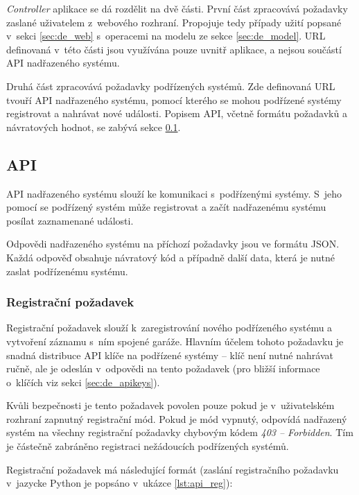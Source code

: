 \textit{Controller} aplikace se dá rozdělit na dvě části. První část zpracovává požadavky zaslané uživatelem z~webového rozhraní. Propojuje tedy případy užití popsané v~sekci \ref{sec:de_web} s~operacemi na modelu ze sekce \ref{sec:de_model}. URL definovaná v~této části jsou využívána pouze uvnitř aplikace, a nejsou součástí API nadřazeného systému.

Druhá část zpracovává požadavky podřízených systémů. Zde definovaná URL tvouří API nadřazeného systému, pomocí kterého se mohou podřízené systémy registrovat a nahrávat nové události. Popisem API, včetně formátu požadavků a návratových hodnot, se zabývá sekce \ref{sec:de_api}.

\subsection{API}
\label{sec:de_api}


API nadřazeného systému slouží ke komunikaci s~podřízenými systémy. S~jeho pomocí se podřízený systém může registrovat a začít nadřazenému systému posílat zaznamenané události.

Odpovědi nadřazeného systému na příchozí požadavky jsou ve formátu JSON. Každá odpověď obsahuje návratový kód a případně další data, která je nutné zaslat podřízenému systému.

\subsubsection{Registrační požadavek}

Registrační požadavek slouží k~zaregistrování nového podřízeného systému a vytvoření záznamu s~ním spojené garáže. Hlavním účelem tohoto požadavku je snadná distribuce API klíče na podřízené systémy -- klíč není nutné nahrávat ručně, ale je odeslán v~odpovědi na tento požadavek (pro bližší informace o~klíčích viz sekci \ref{sec:de_apikeys}).

Kvůli bezpečnosti je tento požadavek povolen pouze pokud je v~uživatelském rozhraní zapnutný registrační mód. Pokud je mód vypnutý, odpovídá nadřazený systém na všechny registrační požadavky chybovým kódem \textit{403 -- Forbidden}. Tím je částečně zabráněno registraci nežádoucích podřízených systémů.

Registrační požadavek má následující formát (zaslání registračního požadavku v~jazycke Python je popsáno v~ukázce \ref{lst:api_reg}):

